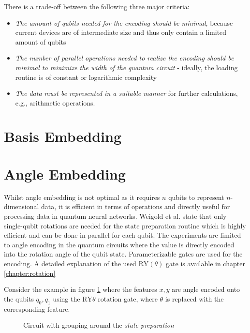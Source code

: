 There is a trade-off between the following three major criteria\cite{Weigold2021_ExpandingDataEncodingPatterns}:
\begin{itemize}
    \item \textit{The amount of qubits needed for the encoding should be minimal}, because current devices are of intermediate size and thus only contain a limited amount of qubits
    \item \textit{The number of parallel operations needed to realize the encoding should be minimal to minimize the width of the quantum circuit} - ideally, the loading routine is of constant or logarithmic complexity
    \item \textit{The data must be represented in a suitable manner} for further calculations, e.g., arithmetic operations.
\end{itemize}

\section{Basis Embedding}\label{section:basis_embedding}


\section{Angle Embedding}\label{section:angle_embedding}

Whilst angle embedding is not optimal as it requires $n$ qubits to represent $n$-dimensional data, it is efficient in terms of operations and directly useful for processing data in quantum neural networks\cite{Weigold2021_ExpandingDataEncodingPatterns,leymannBitterTruthGatebased2020}. Weigold et al.  state that only single-qubit rotations are needed for the state preparation routine which is highly efficient and can be done in parallel for each qubit. \break{}
The experiments are limited to angle encoding in the quantum circuits where the value is directly encoded into the rotation angle of the qubit state. Parameterizable gates\cite{qiskit_rygate_nodate} are used for the encoding. A detailed explanation of the used $\mathrm{RY}(\theta)$ gate is available in chapter \ref{chapter:rotation} \break{}
 
Consider the example in figure \ref{fig:example_encoding_circuit_ry} where the features $x, y$ are angle encoded onto the qubits $q_0, q_1$ using the $\mathrm{RY}\theta$ rotation gate, where $\theta$ is replaced with the corresponding feature. 

\begin{figure}[!h]
    \centering
    \caption{Circuit with grouping around the \textit{state preparation}}
    \label{fig:example_encoding_circuit_ry}
\end{figure}

